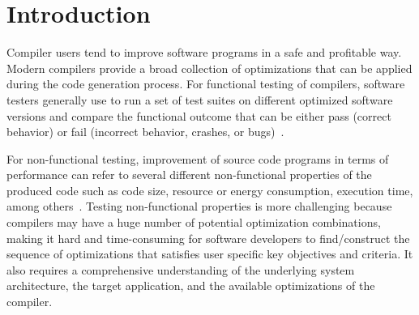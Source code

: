 

\section{Introduction}
Compiler users tend to improve software programs in a safe and profitable way. Modern compilers provide a broad collection of optimizations that can be applied during the code generation process. 
For functional testing of compilers, software testers generally use to run a set of test suites on different optimized software versions and compare the functional outcome that can be either pass (correct behavior) or fail (incorrect behavior, crashes, or bugs)~\cite{chen2016empirical,hoste2008cole,le2014compiler}.

For non-functional testing, improvement of source code programs in terms of performance can refer to several different non-functional properties of the produced code such as code size, resource or energy consumption, execution time, among others~\cite{almagor2004finding,pan2006fast}.
Testing non-functional properties is more challenging because compilers may have a huge number of potential optimization combinations, making it hard and time-consuming for software developers to find/construct the sequence of optimizations that satisfies user specific key objectives and criteria. It also requires a comprehensive understanding of the underlying system architecture, the target application, and the available optimizations of the compiler.

